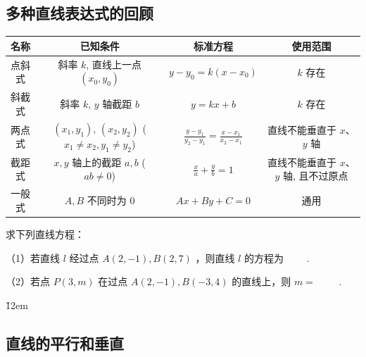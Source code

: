 \subsection{多种直线表达式的回顾}
\begin{center}
    \begin{tabular}{|c|c|c|c|}
        \hline
        \textbf{名称} & \textbf{已知条件}                                             & \textbf{标准方程}                                   & \textbf{使用范围}            \\
        \hline
        点斜式         & 斜率 $k$, 直线上一点 $(x_0,y_0)$                                 & $y-y_0 = k(x-x_0)$                              & $k$ 存在                   \\
        \hline
        斜截式         & 斜率 $k$, $y$ 轴截距 $b$                                       & $y=kx+b$                                        & $k$ 存在                   \\
        \hline
        两点式         & $(x_1, y_1)$, $(x_2, y_2)$ ($x_1 \neq x_2, y_1 \neq y_2$) & $\frac{y-y_1}{y_2-y_1} = \frac{x-x_1}{x_2-x_1}$ & 直线不能垂直于 $x$、$y$ 轴        \\
        \hline
        截距式         & $x,y$ 轴上的截距 $a,b$ ($ab \neq 0$)                           & $\frac{x}{a} + \frac{y}{b} = 1$                 & 直线不能垂直于 $x$、$y$ 轴, 且不过原点 \\
        \hline
        一般式         & $A, B$ 不同时为 $0$                                           & $Ax+By+C=0$                                     & 通用                       \\
        \hline
    \end{tabular}
\end{center}

\begin{problem}
求下列直线方程：

（1）若直线 $l$ 经过点 $A(2,-1), B(2,7)$ ，则直线 $l$ 的方程为 \underline{$\qquad$}.

（2）若点 $P(3, m)$ 在过点 $A(2,-1), B(-3,4)$ 的直线上，则 $m=$ \underline{$\qquad$}.
\end{problem}

\v{12em}

\subsection{直线的平行和垂直}


